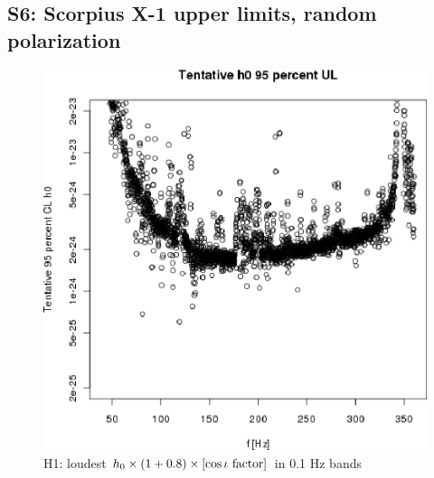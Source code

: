 \subsection{S6: Scorpius X-1 upper limits, random polarization}

\begin{figure}
\begin{center}
\includegraphics[width=0.5\paperwidth,height=0.35\paperheight]{plots/h0FullUL95logGuess-H1.eps}
\caption{
H1: loudest $h_0 \times \left( 1 + 0.8 \right) \times \left[\cos \iota \textup{ factor}\right]$ in 0.1 Hz bands}
\end{center}
\end{figure}

